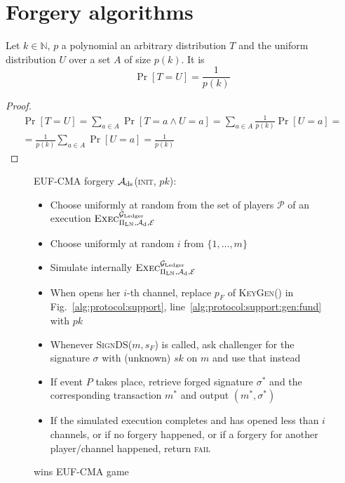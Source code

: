 \section{Forgery algorithms}
  \begin{proposition}
  \label{prop:distrib}
    Let $k \in \mathbb{N}$, $p$ a polynomial an arbitrary distribution $T$ and
    the uniform distribution $U$ over a set $A$ of size $p(k)$. It is
    \begin{equation*}
      \Pr[T = U] = \frac{1}{p(k)}
    \end{equation*}
  \end{proposition}

  \begin{proof}
    \begin{gather*}
      \Pr[T = U] = \sum\limits_{a \in A}\Pr[T = a \wedge U = a] = \sum\limits_{a
      \in A}\frac{1}{p(k)}\Pr[U = a] =\\
      = \frac{1}{p(k)}\sum\limits_{a \in A}\Pr[U = a] = \frac{1}{p(k)}
    \end{gather*}
  \end{proof}

  \begin{figure}[H]
    \begin{algobox}{\textsf{EUF-CMA} forgery}
      $\mathcal{A}_{\mathrm{ds}}$(\textsc{init}, $pk$):
      \begin{itemize}
        \item Choose uniformly at random \alice{} from the set of players
        $\mathcal{P}$ of an execution
        $\textsc{Exec}^{\mathcal{G}_{\mathrm{Ledger}}}_{\Pi_{\mathrm{LN}}, \mathcal{A}_{\mathrm{d}},
        \mathcal{E}}$
        \item Choose uniformly at random $i$ from $\{1, \dots, m\}$
        \item Simulate internally
        $\textsc{Exec}^{\mathcal{G}_{\mathrm{Ledger}}}_{\Pi_{\mathrm{LN}}, \mathcal{A}_{\mathrm{d}},
        \mathcal{E}}$
        \item When \alice{} opens her $i$-th channel, replace $p_F$ of
        \textsc{KeyGen}() in Fig.~\ref{alg:protocol:support},
        line~\ref{alg:protocol:support:gen:fund} with $pk$
        \item Whenever \textsc{SignDS}($m, s_F$) is called, ask challenger for
        the signature $\sigma$ with (unknown) $sk$ on $m$ and use that instead
        \item If event $P$ takes place, retrieve forged signature $\sigma^*$ and
        the corresponding transaction $m^*$ and output $(m^*, \sigma^*)$
        \item If the simulated execution completes and \alice{} has opened less
        than $i$ channels, or if no forgery happened, or if a forgery for
        another player/channel happened, return \textsc{fail}
      \end{itemize}
    \end{algobox}
    \caption{wins \textsf{EUF-CMA} game}
    \label{alg:forge:ds}
  \end{figure}

